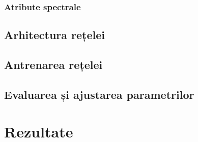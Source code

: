 \subsubsection*{Atribute spectrale}

\subsection{Arhitectura rețelei}

\subsection{Antrenarea rețelei}

\subsection{Evaluarea și ajustarea parametrilor}

\section{Rezultate}
